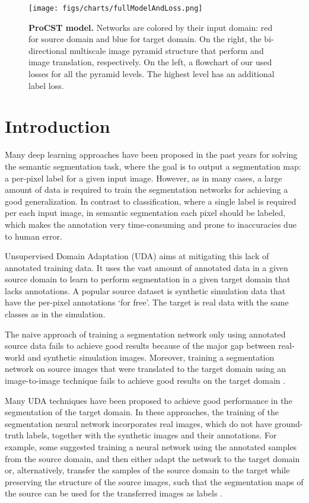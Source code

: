 \documentclass[letterpaper]{article} \usepackage[]{aaai23}  \usepackage{times}  \usepackage{helvet}  \usepackage{courier}  \usepackage[hyphens]{url}  \usepackage{graphicx} \urlstyle{rm} \def\UrlFont{\rm}  \usepackage{natbib}  \usepackage{caption} \frenchspacing  \setlength{\pdfpagewidth}{8.5in} \setlength{\pdfpageheight}{11in} \usepackage{algorithm}
\begin{document}
\begin{figure*}
    \centering
    \texttt{[image: figs/charts/fullModelAndLoss.png]}
    \caption{{\bf ProCST model.} Networks are colored by their input domain: red for source domain and blue for target domain. On the right, the bi-directional multiscale image pyramid structure that perform   and  image translation, respectively. On the left, a flowchart of our used losses  for all the pyramid levels. The highest level  has an additional label loss.}
    \label{fig:full_model}
\end{figure*}

\section{Introduction}

Many deep learning approaches have been proposed in the past years for solving the semantic segmentation task, where the goal is to output a segmentation map: a per-pixel label for a given input image. However, as in many cases, a large amount of data is required to train the segmentation networks for achieving a good generalization. In contrast to classification, where a single label is required per each input image, in semantic segmentation each pixel should be labeled, which makes the annotation very time-consuming and prone to inaccuracies due to human error.

Unsupervised Domain Adaptation (UDA) aims at mitigating this lack of annotated training data. It uses the vast amount of annotated data in a given source domain to learn to perform segmentation in a given target domain that lacks annotations.
A popular source dataset is synthetic simulation data that have the per-pixel annotations `for free'. The target is real data with the same classes as in the simulation.

The naive approach of training a segmentation network only using annotated source data fails to achieve good results because of the major gap between real-world and synthetic simulation images. Moreover, training a segmentation network on source images that were translated to the target domain using an image-to-image technique fails to achieve good results on the target domain \cite{hoffman2018cycada}. 


Many UDA techniques have been proposed to achieve good performance in the segmentation of the target domain. 
In these approaches, the training of the segmentation neural network incorporates real images, which do not have ground-truth labels, together with the synthetic images and their annotations.
For example, some suggested training a neural network using the annotated samples from the source domain, and then either adapt the network to the target domain \cite{zhang2021prototypical} or, alternatively, transfer the samples of the source domain to the target while preserving the structure of the source images, such that the segmentation maps of the source can be used for the transferred images as labels \cite{wang2021consistency, li2019bidirectional, yang2020fda}. 
\end{document}
